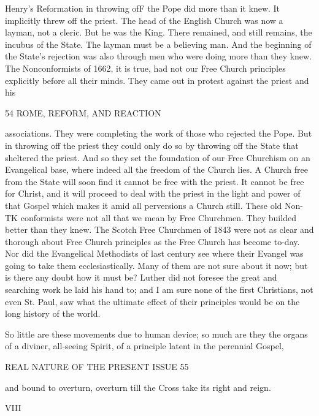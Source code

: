 \documentclass[12pt,a5paper,oneside]{book}
\begin{document}
Henry's Reformation in throwing ofF the Pope did 
more than it knew. It implicitly threw off the 
priest. The head of the English Church was now 
a layman, not a cleric. But he was the King. 
There remained, and still remains, the incubus of 
the State. The layman must be a believing man. 
And the beginning of the State's rejection was also 
through men who were doing more than they knew. 
The Nonconformists of 1662, it is true, had not our 
Free Church principles explicitly before all their minds. 
They came out in protest against the priest and his 



54 ROME, REFORM, AND REACTION 

associations. They were completing the work of 
those who rejected the Pope. But in throwing off 
the priest they could only do so by throwing off the 
State that sheltered the priest. And so they set the 
foundation of our Free Churchism on an Evangelical 
base, where indeed all the freedom of the Church 
lies. A Church free from the State will soon find it 
cannot be free with the priest. It cannot be free for 
Christ, and it will proceed to deal with the priest in 
the light and power of that Gospel which makes it 
amid all perversions a Church still. These old Non-TK
conformists were not all that we mean by Free 
Churchmen. They builded better than they knew. 
The Scotch Free Churchmen of 1843 were not as 
clear and thorough about Free Church principles as 
the Free Church has become to-day. Nor did the 
Evangelical Methodists of last century see where their 
Evangel was going to take them ecclesiastically. 
Many of them are not sure about it now; but is 
there any doubt how it must be? Luther did not 
foresee the great and searching work he laid his hand 
to; and I am sure none of the first Christians, not 
even St. Paul, saw what the ultimate effect of their 
principles would be on the long history of the world. 

So little are these movements due to human device; 
so much are they the organs of a diviner, all-seeing 
Spirit, of a principle latent in the perennial Gospel, 



REAL NATURE OF THE PRESENT ISSUE 55 

and bound to overturn, overturn till the Cross take 
its right and reign. 



VIII 
\end{document}
